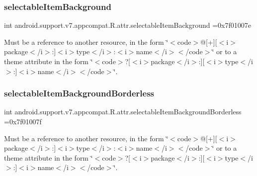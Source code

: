 \subsubsection{\texorpdfstring{selectable\+Item\+Background}{selectableItemBackground}}
{\footnotesize\ttfamily int android.\+support.\+v7.\+appcompat.\+R.\+attr.\+selectable\+Item\+Background =0x7f01007e\hspace{0.3cm}{\ttfamily [static]}}

Must be a reference to another resource, in the form \char`\"{}$<$code$>$@\mbox{[}+\mbox{]}\mbox{[}$<$i$>$package$<$/i$>$\+:\mbox{]}$<$i$>$type$<$/i$>$\+:$<$i$>$name$<$/i$>$$<$/code$>$\char`\"{} or to a theme attribute in the form \char`\"{}$<$code$>$?\mbox{[}$<$i$>$package$<$/i$>$\+:\mbox{]}\mbox{[}$<$i$>$type$<$/i$>$\+:\mbox{]}$<$i$>$name$<$/i$>$$<$/code$>$\char`\"{}. \mbox{\label{classandroid_1_1support_1_1v7_1_1appcompat_1_1R_1_1attr_aab4c287d6aa1e792e2151d495253b9aa}} 
\subsubsection{\texorpdfstring{selectable\+Item\+Background\+Borderless}{selectableItemBackgroundBorderless}}
{\footnotesize\ttfamily int android.\+support.\+v7.\+appcompat.\+R.\+attr.\+selectable\+Item\+Background\+Borderless =0x7f01007f\hspace{0.3cm}{\ttfamily [static]}}

Must be a reference to another resource, in the form \char`\"{}$<$code$>$@\mbox{[}+\mbox{]}\mbox{[}$<$i$>$package$<$/i$>$\+:\mbox{]}$<$i$>$type$<$/i$>$\+:$<$i$>$name$<$/i$>$$<$/code$>$\char`\"{} or to a theme attribute in the form \char`\"{}$<$code$>$?\mbox{[}$<$i$>$package$<$/i$>$\+:\mbox{]}\mbox{[}$<$i$>$type$<$/i$>$\+:\mbox{]}$<$i$>$name$<$/i$>$$<$/code$>$\char`\"{}. \mbox{\label{classandroid_1_1support_1_1v7_1_1appcompat_1_1R_1_1attr_a37a658e9544ba1803be9daef3fbaa0e3}} 
